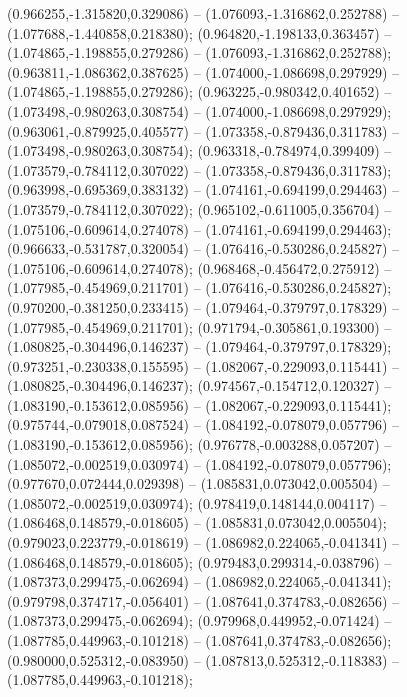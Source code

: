  (0.966255,-1.315820,0.329086) -- (1.076093,-1.316862,0.252788) -- (1.077688,-1.440858,0.218380);
 (0.964820,-1.198133,0.363457) -- (1.074865,-1.198855,0.279286) -- (1.076093,-1.316862,0.252788);
 (0.963811,-1.086362,0.387625) -- (1.074000,-1.086698,0.297929) -- (1.074865,-1.198855,0.279286);
 (0.963225,-0.980342,0.401652) -- (1.073498,-0.980263,0.308754) -- (1.074000,-1.086698,0.297929);
 (0.963061,-0.879925,0.405577) -- (1.073358,-0.879436,0.311783) -- (1.073498,-0.980263,0.308754);
 (0.963318,-0.784974,0.399409) -- (1.073579,-0.784112,0.307022) -- (1.073358,-0.879436,0.311783);
 (0.963998,-0.695369,0.383132) -- (1.074161,-0.694199,0.294463) -- (1.073579,-0.784112,0.307022);
 (0.965102,-0.611005,0.356704) -- (1.075106,-0.609614,0.274078) -- (1.074161,-0.694199,0.294463);
 (0.966633,-0.531787,0.320054) -- (1.076416,-0.530286,0.245827) -- (1.075106,-0.609614,0.274078);
 (0.968468,-0.456472,0.275912) -- (1.077985,-0.454969,0.211701) -- (1.076416,-0.530286,0.245827);
 (0.970200,-0.381250,0.233415) -- (1.079464,-0.379797,0.178329) -- (1.077985,-0.454969,0.211701);
 (0.971794,-0.305861,0.193300) -- (1.080825,-0.304496,0.146237) -- (1.079464,-0.379797,0.178329);
 (0.973251,-0.230338,0.155595) -- (1.082067,-0.229093,0.115441) -- (1.080825,-0.304496,0.146237);
 (0.974567,-0.154712,0.120327) -- (1.083190,-0.153612,0.085956) -- (1.082067,-0.229093,0.115441);
 (0.975744,-0.079018,0.087524) -- (1.084192,-0.078079,0.057796) -- (1.083190,-0.153612,0.085956);
 (0.976778,-0.003288,0.057207) -- (1.085072,-0.002519,0.030974) -- (1.084192,-0.078079,0.057796);
 (0.977670,0.072444,0.029398) -- (1.085831,0.073042,0.005504) -- (1.085072,-0.002519,0.030974);
 (0.978419,0.148144,0.004117) -- (1.086468,0.148579,-0.018605) -- (1.085831,0.073042,0.005504);
 (0.979023,0.223779,-0.018619) -- (1.086982,0.224065,-0.041341) -- (1.086468,0.148579,-0.018605);
 (0.979483,0.299314,-0.038796) -- (1.087373,0.299475,-0.062694) -- (1.086982,0.224065,-0.041341);
 (0.979798,0.374717,-0.056401) -- (1.087641,0.374783,-0.082656) -- (1.087373,0.299475,-0.062694);
 (0.979968,0.449952,-0.071424) -- (1.087785,0.449963,-0.101218) -- (1.087641,0.374783,-0.082656);
 (0.980000,0.525312,-0.083950) -- (1.087813,0.525312,-0.118383) -- (1.087785,0.449963,-0.101218);
